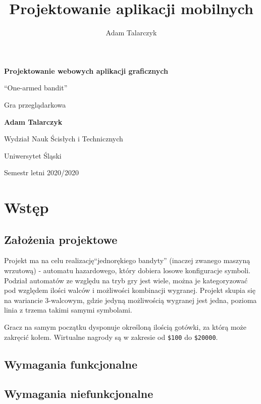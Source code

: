 \documentclass[a4paper,11pt,titlepage]{article}
\author{Adam Talarczyk}
\title{Projektowanie aplikacji mobilnych}
\begin{document}
\begin{titlepage}
    \begin{center}
        \vspace*{1cm}
 
        \Huge
        \textbf{Projektowanie webowych aplikacji graficznych}
 
        \vspace{0.5cm}
        \LARGE
        ``One-armed bandit''


Gra przeglądarkowa
 
        \vspace{1.5cm}
 
        \textbf{Adam Talarczyk}
 
        \vfill
 
        \vspace{0.8cm}
 
        \Large
        Wydział Nauk Ścisłych i Technicznych

        Uniwersytet Śląski

	Semestr letni 2020/2020
 
    \end{center}
\end{titlepage}
\newpage
\tableofcontents
\newpage

\section{Wstęp}
\subsection{Założenia projektowe}
Projekt ma na celu realizację``jednorękiego bandyty'' (inaczej zwanego maszyną wrzutową) - automatu hazardowego, który dobiera losowe konfiguracje symboli. Podział automatów ze względu na tryb gry jest wiele, można je kategoryzować pod względem ilości walców i możliwości kombinacji wygranej. Projekt skupia się na wariancie 3-walcowym, gdzie jedyną możliwością wygranej jest jedna, pozioma linia z trzema takimi samymi symbolami.

Gracz na samym początku dysponuje określoną ilością gotówki, za którą może zakręcić kołem. Wirtualne nagrody są w zakresie od \verb|$100| do \verb|$20000|.

\subsection{Wymagania funkcjonalne}

\subsection{Wymagania niefunkcjonalne}
\end{document}
